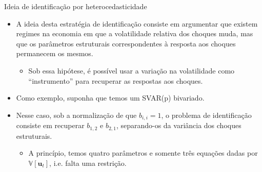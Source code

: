 \documentclass[11pt]{beamer}
\begin{document}
\begin{frame}{Ideia de identificação por heterocedasticidade}
	\begin{itemize}
		\item A ideia desta estratégia de identificação consiste em argumentar que existem regimes na economia em que a volatilidade relativa dos choques muda, mas que os parâmetros estruturais correspondentes à resposta aos choques permanecem os mesmos.
		\begin{itemize}
		\item Sob essa hipótese, é possível usar a variação na volatilidade como ``instrumento'' para recuperar as respostas aos choques.
	\end{itemize}
		\item Como exemplo, suponha que temos um SVAR(p) bivariado.
		\item Nesse caso, sob a normalização de que $b_{i,i} = 1$, o problema de identificação consiste em recuperar $b_{1,2}$ e $b_{2,1}$, separando-os da variância dos choques estruturais.
		\begin{itemize}
			\item A princípio, temos quatro parâmetros e somente três equações dadas por $\mathbb{V}[\boldsymbol{u}_t]$, i.e. falta uma restrição.
		\end{itemize}
	\end{itemize}
\end{frame}
\end{document}
